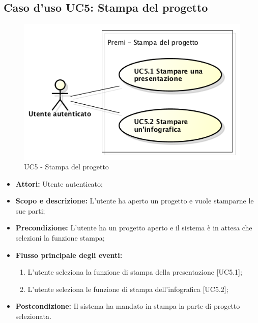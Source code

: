 \newpage
\subsection{Caso d'uso UC5: Stampa del progetto}
\begin{figure}[h] 
	\centering 
	\includegraphics[scale=0.45] {img/UC5.png} 
	\caption{UC5 - Stampa del progetto} 
\end{figure}

\begin{itemize}
	\item \textbf{Attori:} Utente autenticato;
	\item \textbf{Scopo e descrizione:} L'utente ha aperto un progetto e vuole stamparne le sue parti;
	\item \textbf{Precondizione:} L'utente ha un progetto aperto e il sistema è in attesa che selezioni la funzione stampa;
	\item \textbf{Flusso principale degli eventi:}
	\begin{enumerate}
		\item L'utente seleziona la funzione di stampa della presentazione [UC5.1];
		\item L'utente seleziona le funzione di stampa dell'infografica [UC5.2];
	\end{enumerate}
	\item \textbf{Postcondizione:} Il sistema ha mandato in stampa la parte di progetto selezionata.
\end{itemize}


